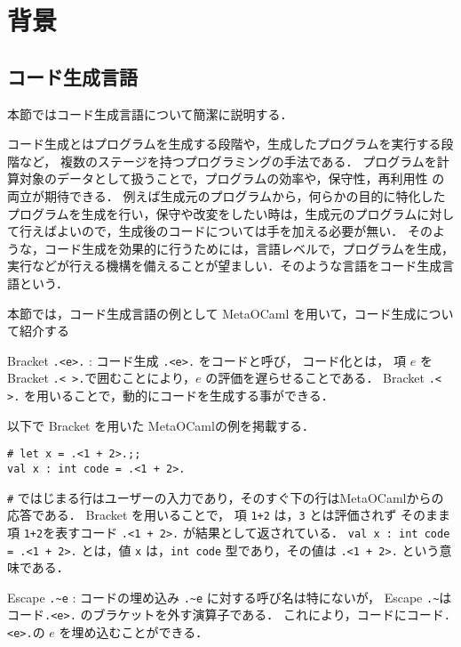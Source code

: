\chapter{背景}

\section{コード生成言語}
本節ではコード生成言語について簡潔に説明する．

コード生成とはプログラムを生成する段階や，生成したプログラムを実行する段階など，
複数のステージを持つプログラミングの手法である．
プログラムを計算対象のデータとして扱うことで，プログラムの効率や，保守性，再利用性 の両立が期待できる．
例えば生成元のプログラムから，何らかの目的に特化したプログラムを生成を行い，保守や改変をしたい時は，生成元のプログラムに対して行えばよいので，生成後のコードについては手を加える必要が無い．
そのような，コード生成を効果的に行うためには，言語レベルで，プログラムを生成，実行などが行える機構を備えることが望ましい．そのような言語をコード生成言語という．

本節では，コード生成言語の例として MetaOCaml を用いて，コード生成について紹介する

Bracket \lstinline|.<e>.| : コード生成
\lstinline|.<e>.| をコードと呼び，
コード化とは， 項 $e$ を Bracket \lstinline|.< >.|で囲むことにより，$e$ の評価を遅らせることである．
Bracket \lstinline|.< >.| を用いることで，動的にコードを生成する事ができる．

以下で Bracket を用いた MetaOCamlの例を掲載する．
\begin{lstlisting}
# let x = .<1 + 2>.;;
val x : int code = .<1 + 2>.
\end{lstlisting}
\lstinline|#| ではじまる行はユーザーの入力であり，そのすぐ下の行はMetaOCamlからの応答である．
Bracket を用いることで， 項 \lstinline|1+2| は，\lstinline|3| とは評価されず そのまま項 \lstinline|1+2|を表すコード \lstinline|.<1 + 2>.| が結果として返されている．
\lstinline|val x : int code = .<1 + 2>.| とは，値 \lstinline|x| は，\lstinline|int code| 型であり，その値は \lstinline|.<1 + 2>.| という意味である．

Escape \lstinline|.~e| : コードの埋め込み
\lstinline|.~e| に対する呼び名は特にないが，
Escape \lstinline|.~|はコード\lstinline|.<e>.| のブラケットを外す演算子である．
これにより，コードにコード\lstinline|.<e>.|の $e$ を埋め込むことができる．

